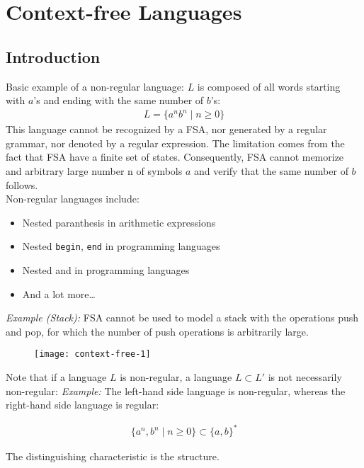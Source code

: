 \section{Context-free Languages}
\subsection{Introduction}
Basic example of a non-regular language: $L$ is composed of all words starting with $a$'s
and ending with the same number of $b$'s:
\begin{align*}
  L=\{a^n b^n \mid n \geq 0\}
\end{align*}
This language cannot be recognized by a FSA,
nor generated by a regular grammar,
nor denoted by a regular expression.
The limitation comes from the fact that FSA
have a finite set of states. Consequently,
FSA cannot memorize and arbitrary large number n 
of symbols $a$ and verify that the same number of $b$ follows.\\

Non-regular languages include:
\begin{itemize}
  \item Nested paranthesis in arithmetic expressions
  \item Nested \texttt{begin}, \texttt{end} in programming languages
  \item Nested \texttt{\textbraceleft} and \texttt{\textbraceright} in programming languages
  \item And a lot more\dots
\end{itemize}
\textit{Example (Stack):} FSA cannot be used to model
a stack with the operations push and pop, for which the number 
of push operations is arbitrarily large.
\begin{figure}[H]
  \centering
  \texttt{[image: context-free-1]}
\end{figure}
Note that if a language $L$ is non-regular,
a language $L \subset L'$ is not necessarily non-regular:
\textit{Example:} The left-hand side language is non-regular,
whereas the right-hand side language is regular:

\begin{align*}
  \{ a^{n} , b^{n} \mid n \geq 0 \} \subset \{ a , b \}^{*}
\end{align*}

The distinguishing characteristic is the structure.
